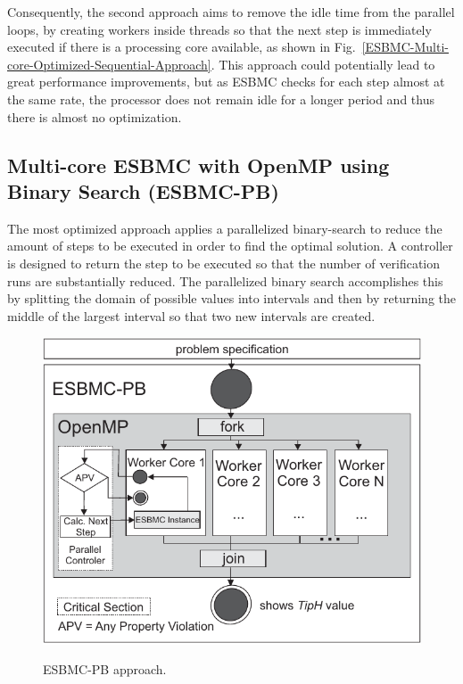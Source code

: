 \documentclass{doublecol-new}
\theoremstyle{TH}{
\newtheorem{lemma}{Lemma}
\newtheorem{theorem}[lemma]{Theorem}
\newtheorem{corrolary}[lemma]{Corrolary}
\newtheorem{conjecture}[lemma]{Conjecture}
\newtheorem{proposition}[lemma]{Proposition}
\newtheorem{claim}[lemma]{Claim}
\newtheorem{stheorem}[lemma]{Wrong Theorem}
\newtheorem{algorithm}{Algorithm}
}
\theoremstyle{THrm}{
\newtheorem{definition}{Definition}[section]
\newtheorem{question}{Question}[section]
\newtheorem{remark}{Remark}
\newtheorem{scheme}{Scheme}
}
\theoremstyle{THhit}{
\newtheorem{case}{Case}[section]
}
\begin{document}
Consequently, the second approach aims to remove the idle time from the parallel loops, by creating workers inside threads so that the next step is immediately executed if there is a processing core available, as shown in Fig.~\ref{ESBMC-Multi-core-Optimized-Sequential-Approach}. This approach could potentially lead to great performance improvements, but as ESBMC checks for each step almost at the same rate, the processor does not remain idle for a longer period and thus there is almost no optimization.

\subsection{Multi-core ESBMC with OpenMP using Binary Search (ESBMC-PB)}
\label{Multi-core-ESBMC-with-OpenMP-using-Binary-Search}

The most optimized approach applies a parallelized binary-search to reduce the amount of steps to be executed in order to find the optimal solution. A controller is designed to return the step to be executed so that the number of verification runs are substantially reduced. The parallelized binary search accomplishes this by splitting the domain of possible values into intervals and then by returning the middle of the largest interval so that two new intervals are created.

\begin{figure}[ht]
	\caption{ESBMC-PB approach.}
	\centering
	\includegraphics[scale=0.77]{figures/esbmc-pb.pdf} 
	\label{ESBMC-Binary-Approach}
\end{figure}
\end{document}
